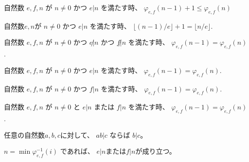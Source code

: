\begin{lemma}
\label{lm:φ_n_minus_one_eq_φ_n}
\leanok
自然数
$
e,f,n
$
が
$
n \ne 0
$
かつ
$
e | n
$
を満たす時、
$
\varphi_{e,f}(n-1) + 1 \le \varphi_{e,f}(n)
$
\end{lemma}

\begin{lemma}
\label{lm:dvd_mod_ne}
\leanok
自然数$e,n$が
$n \ne 0$
かつ
$e | n$
を満たす時、
$\lfloor (n-1) / e \rfloor + 1 = \lfloor n / e \rfloor$.
\end{lemma}

\begin{lemma}
\label{eq:φ_n_minus_one_eq_φ_n}
自然数
$
e, f, n
$
が
$
n \ne 0
$
かつ
$
e \not | n
$
かつ
$
f \not | n
$
を満たす時、
$
\varphi_{e,f}(n-1) = \varphi_{e,f}(n)
$.
\end{lemma}

\begin{lemma}
\label{lm:φ_n_minus_one_ne_φ_n_e}
自然数
$
e, f, n
$
が
$
n \ne 0
$
かつ
$
e | n
$
を満たす時、
$
\varphi_{e,f}(n-1) = \varphi_{e,f}(n)
$.
\end{lemma}

\begin{lemma}
\label{lm:φ_n_minus_one_ne_φ_n_f}
自然数
$
e, f, n
$
が
$
n \ne 0
$
かつ
$
f | n
$
を満たす時、
$
\varphi_{e,f}(n-1) = \varphi_{e,f}(n)
$.
\end{lemma}

\begin{lemma}
\label{eq:φ_n_minus_one_ne_φ_n}
自然数
$
e, f, n
$
が
$
n \ne 0
$
と
$
e | n
$
または
$
f | n
$
を満たす時、
$
\varphi_{e,f}(n-1) = \varphi_{e,f}(n)
$.
\end{lemma}

\begin{lemma}
\label{lm:nat_mul_dvd}
\leanok
任意の自然数$a,b,c$に対して、
$
ab | c
$
ならば
$
b | c
$。
\end{lemma}

\begin{lemma}
\label{lm:min_φinv_dvd}
\leanok
$n = \min \varphi_{e,f}^{-1}(i)$
であれば、
$e | n$または$f | n$が成り立つ。
\end{lemma}

